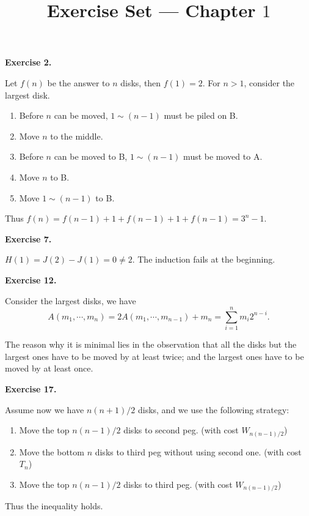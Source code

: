 \documentclass[a4paper]{article}
\title{Exercise Set --- Chapter $1$}
\date{}
\newenvironment{exercise}[1]{
	\par
	\noindent\textbf{Exercise #1.}\quad
}{
	\par
	\bigskip
}
\begin{document}
\maketitle

\begin{exercise}{2}
    Let $f(n)$ be the answer to $n$ disks, then $f(1)=2$. For $n>1$, consider the largest disk.
    \begin{enumerate}
        \item Before $n$ can be moved, $1\sim (n-1)$ must be piled on B.
        \item Move $n$ to the middle.
        \item Before $n$ can be moved to B, $1\sim (n-1)$ must be moved to A.
        \item Move $n$ to B.
        \item Move $1\sim (n-1)$ to B.
    \end{enumerate}
    Thus $f(n)=f(n-1)+1+f(n-1)+1+f(n-1)=3^n-1$.
\end{exercise}

\begin{exercise}{7}
    $H(1)=J(2)-J(1)=0\neq 2$. The induction fails at the beginning.
\end{exercise}

\begin{exercise}{12}
    Consider the largest disks, we have
    $$
    A(m_1,\cdots,m_n)=2A(m_1,\cdots,m_{n-1})+m_n=\sum_{i=1}^nm_i2^{n-i}.
    $$

    The reason why it is minimal lies in the observation that all the disks but the largest 
    ones have to be moved by at least twice; and the largest ones have to be moved by at least once.
\end{exercise}

\begin{exercise}{17}
    Assume now we have $n(n+1)/2$ disks, and we use the following strategy:
    \begin{enumerate}
        \item Move the top $n(n-1)/2$ disks to second peg. (with cost $W_{n(n-1)/2}$)
        \item Move the bottom $n$ disks to third peg without using second one. (with cost $T_n$)
        \item Move the top $n(n-1)/2$ disks to third peg. (with cost $W_{n(n-1)/2}$)
    \end{enumerate}
    Thus the inequality holds.
\end{exercise}
\end{document}
